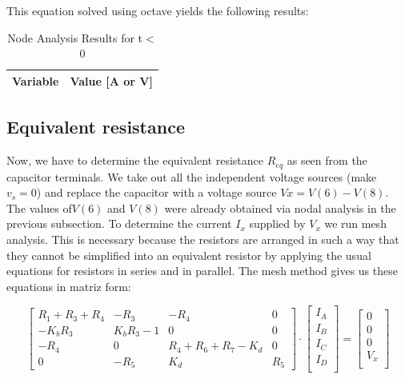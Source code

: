 This equation solved using octave yields the following results:

\begin{table}[H]
    \centering
    \begin{tabular}{|l|r|}
      \hline    
      {\bf Variable} & {\bf Value [A or V]} \\ \hline
      
    \end{tabular}
    \caption{Node Analysis Results for t$<$0}
    \label{tab:nodeanalysis}
  \end{table}
  
  
\subsection{Equivalent resistance}
Now,  we have to determine the equivalent resistance $R_{eq}$ as seen from the capacitor terminals. We take out all the independent voltage sources (make $v_s=0$) and replace the capacitor with a voltage source $Vx= V(6)-V(8)$. The values of$ V(6)$ and $V(8)$ were already obtained via nodal analysis in the previous subsection. To determine the current $I_x$ supplied by $V_x$ we run mesh analysis. This is necessary because the resistors are arranged in such a way that they cannot be simplified into an equivalent resistor by applying the usual equations for resistors in series and in parallel. The mesh method gives us these equations in matriz form:


\begin{equation}\label{eq:matrixeq2}
\begin{bmatrix}
 R_1+R_3+R_4 & -R_3 & -R_4 & 0\\
    -K_bR_3 &  K_bR_3-1 & 0 & 0\\ 
    -R_4 & 0 & R_4+R_6+R_7-K_d & 0\\
    0 & -R_5 & K_d & R_5 
\end{bmatrix}
\cdot
\begin{bmatrix}
I_A\\
I_B \\
I_C \\
I_D \\

    \end{bmatrix}
=
    \begin{bmatrix}
0 \\
0 \\
0 \\
V_x \\

    \end{bmatrix}
  \end{equation}

